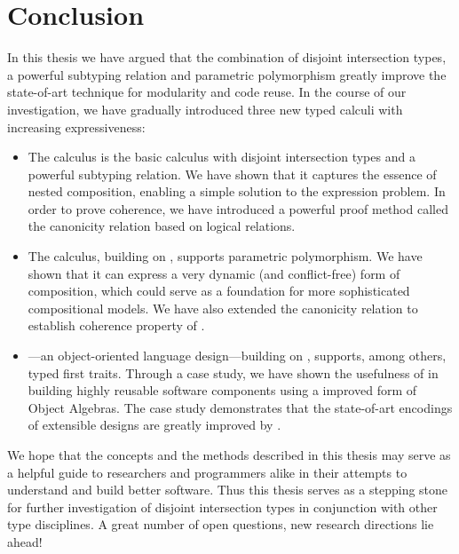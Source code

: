 \chapter{Conclusion}
\label{chap:conclusion}


In this thesis we have argued that the combination of disjoint intersection
types, a powerful subtyping relation and parametric polymorphism greatly improve
the state-of-art technique for modularity and code reuse. In the course of our
investigation, we have gradually introduced three new typed calculi with
increasing expressiveness:
\begin{itemize}
\item The \namee calculus is the basic calculus with disjoint intersection types
  and a powerful subtyping relation. We have shown that it captures the essence
  of nested composition, enabling a simple solution to the expression problem.
  In order to prove coherence, we have introduced a powerful proof method called
  the canonicity relation based on logical relations.
\item The \fnamee calculus, building on \namee, supports parametric
  polymorphism. We have shown that it can express a very dynamic (and
  conflict-free) form of composition, which could serve as a foundation for more
  sophisticated compositional models. We have also extended the canonicity
  relation to establish coherence property of \fnamee.
\item \sedel---an object-oriented language design---building on \fnamee,
  supports, among others, typed first traits. Through a case study, we have
  shown the usefulness of \fnamee in building highly reusable software
  components using a improved form of Object Algebras. The case study
  demonstrates that the state-of-art encodings of extensible designs are greatly
  improved by \fnamee.
\end{itemize}

We hope that the concepts and the methods described in this thesis may serve as
a helpful guide to researchers and programmers alike in their attempts to
understand and build better software. Thus this thesis serves as a stepping
stone for further investigation of disjoint intersection types in conjunction
with other type disciplines. A great number of open questions, new research
directions lie ahead!




